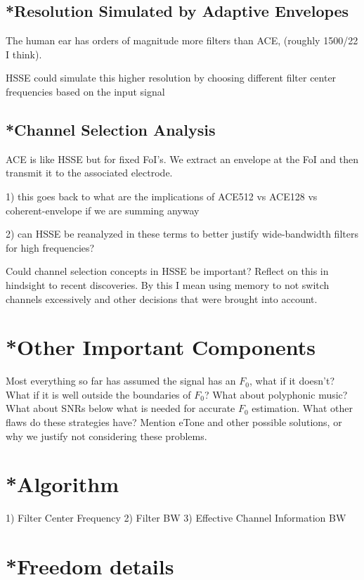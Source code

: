 \documentclass [11pt, proquest] {uwthesis}[2015/03/03]
\begin{document}
\subsection{*Resolution Simulated by Adaptive Envelopes}

The human ear has orders of magnitude more filters than ACE, (roughly 1500/22 I think).

HSSE could simulate this higher resolution by choosing different filter center frequencies based on the input signal

\subsection{*Channel Selection Analysis}

ACE is like HSSE but for fixed FoI's.  We extract an envelope at the FoI and then transmit it to the associated electrode.

1) this goes back to what are the implications of ACE512 vs ACE128 vs coherent-envelope if we are summing anyway

2) can HSSE be reanalyzed in these terms to better justify wide-bandwidth filters for high frequencies?

Could channel selection concepts in HSSE be important?  Reflect on this in hindsight to recent discoveries.  By this I mean using memory to not switch channels excessively and other decisions that were brought into account.

\section{*Other Important Components}

Most everything so far has assumed the signal has an $F_0$, what if it doesn't?  What if it is well outside the boundaries of $F_0$?  What about polyphonic music?  What about SNRs below what is needed for accurate $F_0$ estimation.  What other flaws do these strategies have?  Mention eTone and other possible solutions, or why we justify not considering these problems.

\section{*Algorithm}

1) Filter Center Frequency
2) Filter BW
3) Effective Channel Information BW

\section{*Freedom details}
\end{document}
